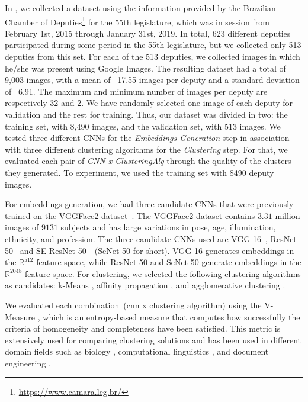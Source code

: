In \cite{mendes2020cluster}, we collected a dataset using the information provided by the Brazilian Chamber of Deputies\footnote{\url{https://www.camara.leg.br/}} for the 55th legislature, which was in session from February 1st, 2015 through January 31st, 2019.
In total, 623 different deputies participated during some period in the 55th legislature, but we collected only 513 deputies from this set.
For each of the 513 deputies, we collected images in which he/she was present using Google Images.
The resulting dataset had a total of 9,003 images, with a mean of ~17.55 images per deputy and a standard deviation of ~6.91. 
The maximum and minimum number of images per deputy are respectively 32 and 2.
We have randomly selected one image of each deputy for validation and the rest for training.
Thus, our dataset was divided in two: the training set, with 8,490 images, and the validation set, with 513 images.  
We tested three different CNNs for the \emph{Embeddings Generation} step in association with three different clustering algorithms for the \emph{Clustering} step.
For that, we evaluated each pair of \emph{CNN x ClusteringAlg} through the quality of the clusters they generated. 
To experiment, we used the training set with 8490 deputy images.

For embeddings generation, we had three candidate CNNs that were previously trained on the VGGFace2 dataset~\cite{cao2018vggface2}. 
The VGGFace2 dataset contains $3.31$ million images of $9131$ subjects and has large variations in pose, age, illumination, ethnicity, and profession.
The three candidate CNNs used are VGG-16~\cite{vgg16}, ResNet-50~\cite{resnet} and SE-ResNet-50~\cite{senet}~(SeNet-50 for short). VGG-16 generates embeddings in the $\mathbb{R}^{512}$  feature space, while ResNet-50 and SeNet-50 generate embeddings in the $\mathbb{R}^{2048}$ feature space.  
For clustering, we selected the following clustering algorithms as candidates: k-Means \cite{lloyd1982least}, affinity propagation \cite{frey2007clustering}, and agglomerative clustering \cite{ward1963hierarchical}.


We evaluated each combination~(cnn x clustering algorithm) using the V-Measure \cite{vmeasure}, which is an entropy-based measure that computes how successfully the criteria of homogeneity and completeness have been satisfied. This metric is extensively used for comparing clustering solutions and has been used in different domain fields such as biology \cite{bio1}, computational linguistics \cite{nlp1}, and document engineering \cite{doceng}.


